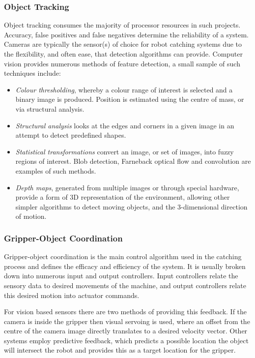 \documentclass[conference]{IEEEtran}
\begin{document}
	\subsubsection{Object Tracking}
	Object tracking consumes the majority of processor resources in such projects. Accuracy, false positives and false negatives determine the reliability of a system. Cameras are typically the sensor(s) of choice for robot catching systems due to the flexibility, and often ease, that detection algorithms can provide. Computer vision provides numerous methods of feature detection, a small sample of such techniques include:
	\begin{itemize}
		\item \textit{Colour thresholding}, whereby a colour range of interest is selected and a binary image is produced. Position is estimated using the centre of mass, or via structural analysis.
		\item \textit{Structural analysis} looks at the edges and corners in a given image in an attempt to detect predefined shapes.
		\item \textit{Statistical transformations} convert an image, or set of images, into fuzzy regions of interest. Blob detection, Farneback optical flow and convolution are examples of such methods.
		\item \textit{Depth maps}, generated from multiple images or through special hardware, provide a form of 3D representation of the environment, allowing other simpler algorithms to detect moving objects, and the 3-dimensional direction of motion.
	\end{itemize}
	\subsubsection{Gripper-Object Coordination}
	Gripper-object coordination is the main control algorithm used in the catching process and defines the efficacy and efficiency of the system. It is usually broken down into numerous input and output controllers. Input controllers relate the sensory data to desired movements of the machine, and output controllers relate this desired motion into actuator commands.
	
	For vision based sensors there are two methods of providing this feedback. If the camera is inside the gripper then visual servoing is used, where an offset from the centre of the camera image directly translates to a desired velocity vector. Other systems employ predictive feedback, which predicts a possible location the object will intersect the robot and provides this as a target location for the gripper.
	
\end{document}
